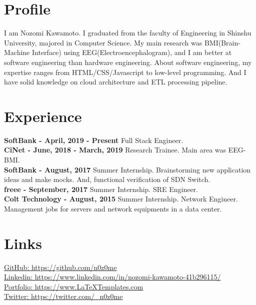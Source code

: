 \documentclass[10pt]{article} %
\begin{document}
\begin{paracol}{2}
\section{Profile}
I am Nozomi Kawamoto. I graduated from the faculty of Engineering in Shinshu University, majored in Computer Science. 
My main research was BMI(Brain-Machine Interface) using EEG(Electroencephalogram), and I am better at software engineering than hardware engineering.
About software engineering, my expertise ranges from HTML/CSS/Javascript to low-level programming. And I have solid knowledge on cloud architecture and ETL processing pipeline. 

\section{Experience}
\textbf{SoftBank - April, 2019 - Present}
Full Stack Engineer.\\

\textbf{CiNet - June, 2018 - March, 2019}
Research Trainee. Main area was EEG-BMI.\\

\textbf{SoftBank - August, 2017}
Summer Internship. Brainstorming new application ideas and make mocks. And, functional verification of SDN Switch.\\

\textbf{freee - September, 2017}
Summer Internship. SRE Engineer.\\

\textbf{Colt Technology - August, 2015}
Summer Internship. Network Engineer. Management jobs for servers and network equipments in a data center.\\

\section{Links}
{\faGithub} \href{https://github.com/n0z0me}{GitHub: https://github.com/n0z0me} \\ %
{\faLinkedinSquare} \href{https://www.linkedin.com/in/nozomi-kawamoto-41b296115/}{Linkedin: https://www.linkedin.com/in/nozomi-kawamoto-41b296115/} \\ %
{\small\faDesktop} \hspace{5mm} \href{https://www.LaTeXTemplates.com}{Portfolio: https://www.LaTeXTemplates.com} \\ %
{\faTwitter} \hspace{5mm} \href{https://twitter.com/_n0z0me}{Twitter: https://twitter.com/_n0z0me}

\end{paracol}

\end{document}

